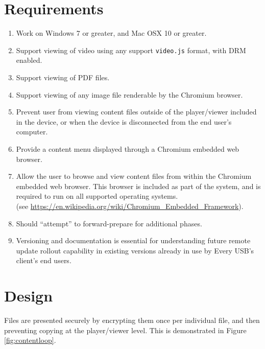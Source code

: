 \documentclass{article}
\begin{document}
\section{Requirements}

\begin{enumerate}
\item Work on Windows 7 or greater, and Mac OSX 10 or greater.
\item Support viewing of video using any support \verb+video.js+ format, 
with DRM enabled.
\item Support viewing of PDF files.
\item Support viewing of any image file renderable by the Chromium browser.
\item Prevent user from viewing content files outside of the 
player/viewer included in the device, or when the device is disconnected from 
the end user's computer.
\item Provide a content menu displayed through a Chromium embedded web browser.
\item Allow the user to browse and view content files from within the
Chromium embedded web browser.  This browser is included as part of
the system, and is required to run on all supported operating
systems.\\
(see \url{https://en.wikipedia.org/wiki/Chromium_Embedded_Framework}).  
\item Should “attempt” to forward-prepare for additional phases.
\item Versioning and documentation is essential for understanding
future remote update rollout capability in existing versions already
in use by Every USB’s client’s end users.

\end{enumerate}

\newpage
\section{Design}

Files are presented securely by encrypting them once per individual file,
and then preventing copying at the player/viewer level.  This is demonstrated
in Figure \ref{fig:contentloop}.
\end{document}
